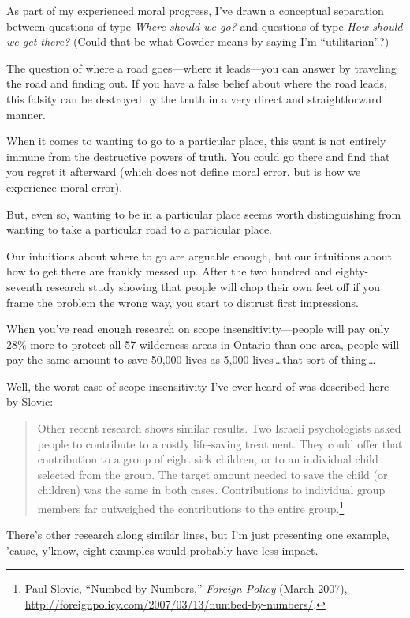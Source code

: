 As part of my experienced moral progress, I've
drawn a conceptual separation between questions of type \textit{Where
should we go?} and questions of type \textit{How should we get there?}
(Could that be what Gowder means by saying I'm
``utilitarian''?)


 The question of where a road goes---where it leads---you can
answer by traveling the road and finding out. If you have a false
belief about where the road leads, this falsity can be destroyed by the
truth in a very direct and straightforward manner.


 When it comes to wanting to go to a particular place, this want is
not entirely immune from the destructive powers of truth. You could go
there and find that you regret it afterward (which does not define
moral error, but is how we experience moral error).


 But, even so, wanting to be in a particular place seems worth
distinguishing from wanting to take a particular road to a particular
place.


 Our intuitions about where to go are arguable enough, but our
intuitions about how to get there are frankly messed up. After the two
hundred and eighty-seventh research study showing that people will chop
their own feet off if you frame the problem the wrong way, you start to
distrust first impressions.


 When you've read enough research on scope
insensitivity---people will pay only 28\% more to protect all 57
wilderness areas in Ontario than one area, people will pay the same
amount to save 50,000 lives as 5,000 lives\,\ldots that sort of thing\,\ldots


 Well, the worst case of scope insensitivity I've
ever heard of was described here by Slovic:

\begin{quote}
{
 Other recent research shows similar results. Two Israeli
psychologists asked people to contribute to a costly life-saving
treatment. They could offer that contribution to a group of eight sick
children, or to an individual child selected from the group. The target
amount needed to save the child (or children) was the same in both
cases. Contributions to individual group members far outweighed the
contributions to the entire group.\footnote{Paul Slovic, ``Numbed by
Numbers,'' \textit{Foreign Policy} (March 2007),
\url{http://foreignpolicy.com/2007/03/13/numbed-by-numbers/}.}}
\end{quote}


 There's other research along similar lines, but
I'm just presenting one example,
'cause, y'know, eight examples would
probably have less impact.


